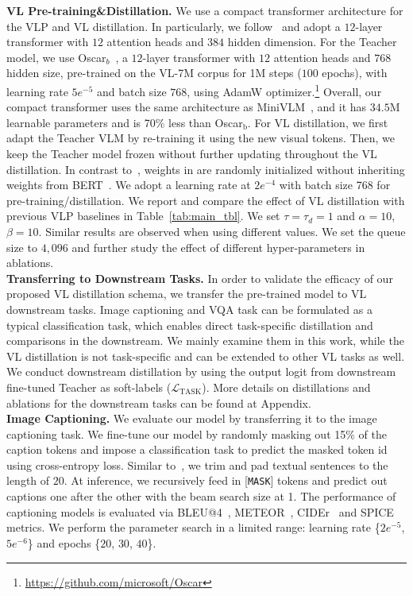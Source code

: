 \noindent \textbf{VL Pre-training\&Distillation.} We use a compact transformer architecture for the VLP and VL distillation. In particularly, we follow~\cite{wang2020minilm,wang2020minivlm} and adopt a $12$-layer transformer with $12$ attention heads and $384$ hidden dimension. For the Teacher model, we use Oscar$_{b}$~\cite{li2020oscar}, a $12$-layer transformer with $12$ attention heads and $768$ hidden size, pre-trained on the VL-7M corpus for 1M steps ($100$ epochs), with learning rate $5e^{-5}$ and batch size $768$, using AdamW optimizer.\footnote{\url{https://github.com/microsoft/Oscar}} Overall, our compact transformer uses the same architecture as MiniVLM~\cite{wang2020minivlm}, and it has $34.5$M learnable parameters and is 70\% less than Oscar$_\text{b}$. 
For VL distillation, we first adapt the Teacher VLM by re-training it using the new visual tokens. Then, we keep the Teacher model frozen without further updating throughout the VL distillation.
In contrast to~\cite{zhou2020unified,li2020oscar}, weights in \distillvlm are randomly initialized without inheriting weights from BERT~\cite{devlin2018bert}. We adopt a learning rate at $2e^{-4}$ with batch size 768 for pre-training/distillation. We report and compare the effect of VL distillation with previous VLP baselines in Table~\ref{tab:main_tbl}. We set $\tau = \tau_d =1$ and $\alpha = 10$, $\beta = 10$. Similar results are observed when using different values. We set the queue size to $4,096$ and further study the effect of different hyper-parameters in ablations. 
\\ [-1.8ex]


\noindent \textbf{Transferring to Downstream Tasks.}
In order to validate the efficacy of our proposed VL distillation schema, we transfer the pre-trained model to VL downstream tasks. Image captioning and VQA task can be formulated as a typical classification task, which enables direct task-specific distillation and comparisons in the downstream. 
We mainly examine them in this work, while the VL distillation is not task-specific and can be extended to other VL tasks as well. We conduct downstream distillation by using the output logit from downstream fine-tuned Teacher as soft-labels ($\mathcal{L}_\text{TASK}$). More details on distillations and ablations for the downstream tasks can be found at Appendix.\\ [-1.8ex]


\noindent \textbf{Image Captioning.} We evaluate our model by transferring it to the image captioning task. 
We fine-tune our model by randomly masking out 15\% of the caption tokens and impose a classification task to predict the masked token id using cross-entropy loss.  Similar to~\cite{devlin2018bert}, we trim and pad textual sentences to the length of $20$. At inference, we recursively feed in [\texttt{MASK}] tokens and predict out captions one after the other with the beam search size at 1. The performance of captioning models is evaluated via BLEU@4~\cite{papineni2002bleu}, METEOR~\cite{denkowski2014meteor}, CIDEr~\cite{vedantam2015cider} and SPICE~\cite{anderson2016spice} metrics. We perform the parameter search in a limited range:  learning rate \{$2e^{-5}$, $5e^{-6}$\} and epochs \{$20$, $30$, $40$\}. \\ [-1.8ex]

